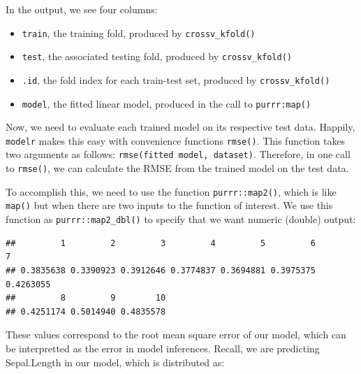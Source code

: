 \documentclass[]{article}
\newenvironment{Shaded}{\begin{snugshade}}{\end{snugshade}}
\newcommand{\KeywordTok}[1]{\textcolor[rgb]{0.13,0.29,0.53}{\textbf{#1}}}
\newcommand{\StringTok}[1]{\textcolor[rgb]{0.31,0.60,0.02}{#1}}
\newcommand{\OperatorTok}[1]{\textcolor[rgb]{0.81,0.36,0.00}{\textbf{#1}}}
\newcommand{\NormalTok}[1]{#1}
\providecommand{\tightlist}{%
  \setlength{\itemsep}{0pt}\setlength{\parskip}{0pt}}
\begin{document}
In the output, we see four columns:

\begin{itemize}
\tightlist
\item
  \texttt{train}, the training fold, produced by
  \texttt{crossv\_kfold()}
\item
  \texttt{test}, the associated testing fold, produced by
  \texttt{crossv\_kfold()}
\item
  \texttt{.id}, the fold index for each train-test set, produced by
  \texttt{crossv\_kfold()}
\item
  \texttt{model}, the fitted linear model, produced in the call to
  \texttt{purrr:map()}
\end{itemize}

Now, we need to evaluate each trained model on its respective test data.
Happily, \texttt{modelr} makes this easy with convenience functions
\texttt{rmse()}. This function takes two arguments as follows:
\texttt{rmse(fitted\ model,\ dataset)}. Therefore, in one call to
\texttt{rmse()}, we can calculate the RMSE from the trained model on the
test data.

To accomplish this, we need to use the function \texttt{purrr::map2()},
which is like \texttt{map()} but when there are two inputs to the
function of interest. We use this function as
\texttt{purrr::map2\_dbl()} to specify that we want numeric (double)
output:

\begin{Shaded}
\end{Shaded}

\begin{verbatim}
##         1         2         3         4         5         6         7 
## 0.3835638 0.3390923 0.3912646 0.3774837 0.3694881 0.3975375 0.4263055 
##         8         9        10 
## 0.4251174 0.5014940 0.4835578
\end{verbatim}

These values correspond to the root mean square error of our model,
which can be interpretted as the error in model inferences. Recall, we
are predicting Sepal.Length in our model, which is distributed as:

\begin{Shaded}
\end{Shaded}
\end{document}
